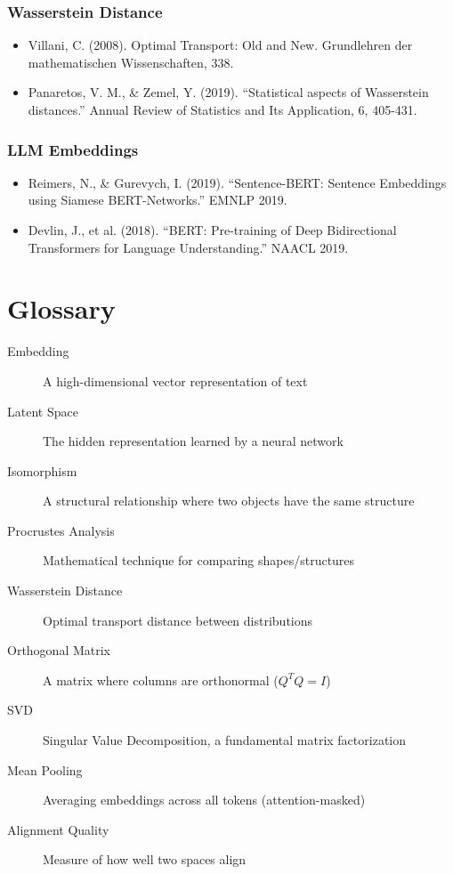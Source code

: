 \documentclass[12pt,a4paper,oneside]{report}
\begin{document}
\subsection{Wasserstein Distance}
\begin{itemize}
    \item Villani, C. (2008). Optimal Transport: Old and New. Grundlehren der mathematischen Wissenschaften, 338.
    \item Panaretos, V. M., \& Zemel, Y. (2019). ``Statistical aspects of Wasserstein distances.'' Annual Review of Statistics and Its Application, 6, 405-431.
\end{itemize}

\subsection{LLM Embeddings}
\begin{itemize}
    \item Reimers, N., \& Gurevych, I. (2019). ``Sentence-BERT: Sentence Embeddings using Siamese BERT-Networks.'' EMNLP 2019.
    \item Devlin, J., et al. (2018). ``BERT: Pre-training of Deep Bidirectional Transformers for Language Understanding.'' NAACL 2019.
\end{itemize}

\appendix

\chapter{Glossary}

\begin{description}
    \item[Embedding] A high-dimensional vector representation of text
    \item[Latent Space] The hidden representation learned by a neural network
    \item[Isomorphism] A structural relationship where two objects have the same structure
    \item[Procrustes Analysis] Mathematical technique for comparing shapes/structures
    \item[Wasserstein Distance] Optimal transport distance between distributions
    \item[Orthogonal Matrix] A matrix where columns are orthonormal ($Q^T Q = I$)
    \item[SVD] Singular Value Decomposition, a fundamental matrix factorization
    \item[Mean Pooling] Averaging embeddings across all tokens (attention-masked)
    \item[Alignment Quality] Measure of how well two spaces align
\end{description}
\end{document}

